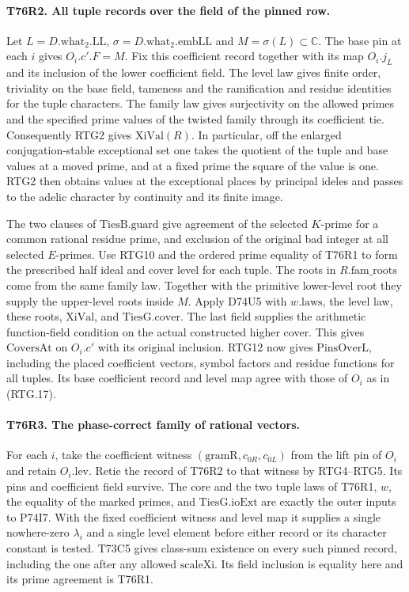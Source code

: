 \paragraph{T76R2. All tuple records over the field of the pinned row.}
Let $L=D.\mathrm{what}_2.\mathrm{LL}$, $\sigma=D.\mathrm{what}_2.\mathrm{embLL}$
and $M=\sigma(L)\subset\mathbb C$. The base pin at each $i$ gives
$O_i.c'.F=M$. Fix this coefficient record together with its map
$O_i.j_L$ and its inclusion of the lower coefficient field.
The level law gives finite order, triviality on the base field,
tameness and the ramification and residue identities for the tuple
characters. The family law gives surjectivity on the allowed primes
and the specified prime values of the twisted family through its
coefficient tie. Consequently RTG2 gives $\mathrm{XiVal}(R)$.
In particular, off the enlarged conjugation-stable exceptional set
one takes the quotient of the tuple and base values at a moved
prime, and at a fixed prime the square of the value is one.
RTG2 then obtains values at the exceptional places by principal
ideles and passes to the adelic character by continuity and its
finite image.

The two clauses of $\mathrm{TiesB.guard}$ give agreement of the
selected $K$-prime for a common rational residue prime, and exclusion
of the original bad integer at all selected $E$-primes. Use
RTG10 and the ordered prime equality of T76R1 to form the prescribed
half ideal and cover level for each tuple. The roots in
$R.\mathrm{fam\_roots}$ come from the same family law. Together
with the primitive lower-level root they supply the upper-level
roots inside $M$. Apply D74U5 with $w.\mathrm{laws}$, the level
law, these roots, $\mathrm{XiVal}$, and $\mathrm{TiesG.cover}$.
The last field supplies the arithmetic function-field condition
on the actual constructed higher cover. This gives
$\mathrm{CoversAt}$ on $O_i.c'$ with its original inclusion.
RTG12 now gives $\mathrm{PinsOverL}$, including the placed
coefficient vectors, symbol factors and residue functions for
all tuples. Its base coefficient record and level map agree
with those of $O_i$ as in (RTG.17).

\paragraph{T76R3. The phase-correct family of rational vectors.}
For each $i$, take the coefficient witness
$(\mathrm{gramR},c_{0R},c_{0L})$ from the lift pin of $O_i$ and
retain $O_i.\mathrm{lev}$. Retie the record of T76R2 to that
witness by RTG4--RTG5. Its pins and coefficient field survive.
The core and the two tuple laws of T76R1, $w$, the equality of
the marked primes, and $\mathrm{TiesG.ioExt}$ are exactly the outer
inputs to P74I7. With the fixed coefficient witness and level map
it supplies a single nowhere-zero $\lambda_i$ and a single level
element before either record or its character constant is tested.
T73C5 gives class-sum existence on every such pinned record,
including the one after any allowed $\mathrm{scaleXi}$. Its field
inclusion is equality here and its prime agreement is T76R1.

